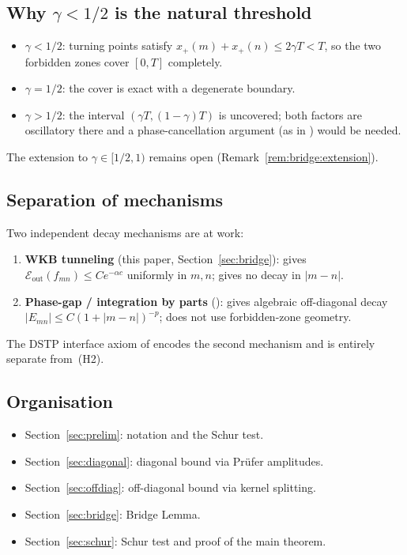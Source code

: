 \documentclass[12pt,a4paper]{article}
\theoremstyle{definition}
\newcommand{\Eout}{\mathcal{E}_{\mathrm{out}}}
\begin{document}
\subsection{Why $\gamma < 1/2$ is the natural threshold}

\begin{itemize}
  \item $\gamma < 1/2$: turning points satisfy
  $x_+(m)+x_+(n) \le 2\gamma T < T$,
  so the two forbidden zones cover $[0,T]$ completely.
  \item $\gamma = 1/2$: the cover is exact with a
  degenerate boundary.
  \item $\gamma > 1/2$: the interval
  $(\gamma T,(1-\gamma)T)$ is uncovered; both factors are
  oscillatory there and a phase-cancellation argument
  (as in \cite{PaperI}) would be needed.
\end{itemize}
The extension to $\gamma \in [1/2,1)$ remains open
(Remark~\ref{rem:bridge:extension}).

\subsection{Separation of mechanisms}

Two independent decay mechanisms are at work:
\begin{enumerate}
  \item \textbf{WKB tunneling} (this paper,
  Section~\ref{sec:bridge}): gives
  $\Eout(f_{mn}) \le Ce^{-\alpha c}$ uniformly in $m,n$;
  gives no decay in $|m-n|$.
  \item \textbf{Phase-gap / integration by parts}
  (\cite{PaperI}): gives algebraic off-diagonal decay
  $|E_{mn}| \le C(1+|m-n|)^{-p}$; does not use
  forbidden-zone geometry.
\end{enumerate}
The DSTP interface axiom of \cite{PaperI} encodes the
second mechanism and is entirely separate from~(H2).

\subsection{Organisation}

\begin{itemize}
  \item Section~\ref{sec:prelim}: notation and
  the Schur test.
  \item Section~\ref{sec:diagonal}: diagonal bound via
  Pr\"ufer amplitudes.
  \item Section~\ref{sec:offdiag}: off-diagonal bound
  via kernel splitting.
  \item Section~\ref{sec:bridge}: Bridge Lemma.
  \item Section~\ref{sec:schur}: Schur test and proof
  of the main theorem.
\end{itemize}
\end{document}
